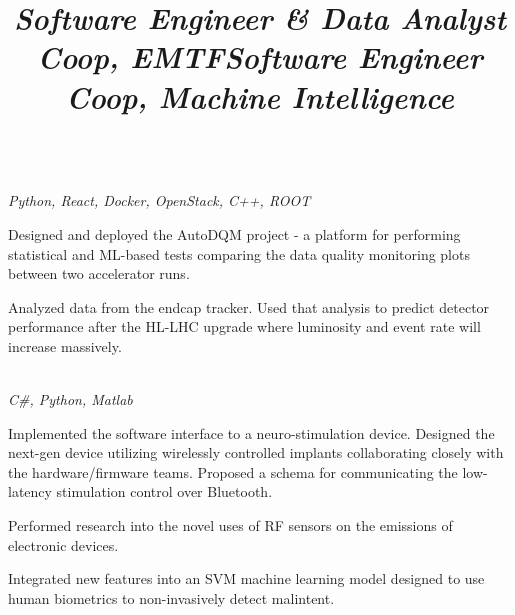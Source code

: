 \documentclass[margin,line,11pt,letterpaper]{res}
\begin{document}
\begin{resume}
    \title{\textit{Software Engineer \& Data Analyst Coop, EMTF}}
    \begin{position}
        \vspace{-3mm}\\
        \emph{Python, React, Docker, OpenStack, C++, ROOT}
        \begin{list2}
            \item Designed and deployed the AutoDQM project - a platform for performing statistical and ML-based tests comparing the data quality monitoring plots between two accelerator runs.
            \item Analyzed data from the endcap tracker. Used that analysis to predict detector performance after the HL-LHC upgrade where luminosity and event rate will increase massively.
        \end{list2}
    \end{position}

    \title{\textit{Software Engineer Coop, Machine Intelligence}}
    \begin{position}
        \vspace{-3mm}\\
        \emph{C\#, Python, Matlab}
        \begin{list2}
            \item Implemented the software interface to a neuro-stimulation device.
            Designed the next-gen device utilizing wirelessly controlled implants collaborating closely with the hardware/firmware teams. 
            Proposed a schema for communicating the low-latency stimulation control over Bluetooth.
            \item Performed research into the novel uses of RF sensors on the emissions of electronic devices.
            \item Integrated new features into an SVM machine learning model designed to use human biometrics to non-invasively detect malintent.
        \end{list2}
    \end{position}
    

\end{resume}
\end{document}
